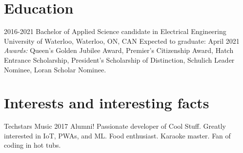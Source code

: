 \documentclass[]{friggeri-cv}
\begin{document}
\section{Education}

\begin{entrylist}
	\entry
	{2016-2021}
	{Bachelor of Applied Science {\normalfont candidate in Electrical Engineering}}
	{\\ University of Waterloo, Waterloo, ON, CAN}
	{Expected to graduate: April 2021 \\
		\emph{Awards:} Queen's Golden Jubilee Award, Premier's Citizenship Award, Hatch Entrance Scholarship, President's Scholarship of Distinction, Schulich Leader Nominee, Loran Scholar Nominee.}
\end{entrylist}

\section{Interests and interesting facts}

Techstars Music 2017 Alumni! Passionate developer of Cool Stuff\texttrademark. Greatly interested in IoT, PWAs, and ML. Food enthusiast. Karaoke master. Fan of coding in hot tubs.

% 
\end{document}
